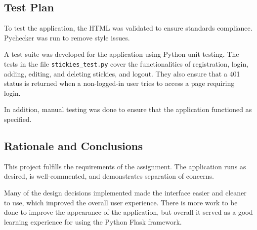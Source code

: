 \documentclass[11pt,letterpaper]{article}
\begin{document}
\subsection{Test Plan}
To test the application, the HTML was validated to ensure standards compliance. Pychecker was run to remove style issues.

A test suite was developed for the application using Python unit testing. The tests in the file \texttt{stickies\_test.py} cover the functionalities of registration, login, adding, editing, and deleting stickies, and logout. They also ensure that a 401 status is returned when a non-logged-in user tries to access a page requiring login.

In addition, manual testing was done to ensure that the application functioned as specified.

\subsection{Rationale and Conclusions}
This project fulfills the requirements of the assignment. The application runs as desired, is well-commented, and demonstrates separation of concerns.

Many of the design decisions implemented made the interface easier and cleaner to use, which improved the overall user experience. There is more work to be done to improve the appearance of the application, but overall it served as a good learning experience for using the Python Flask framework.
\end{document}
